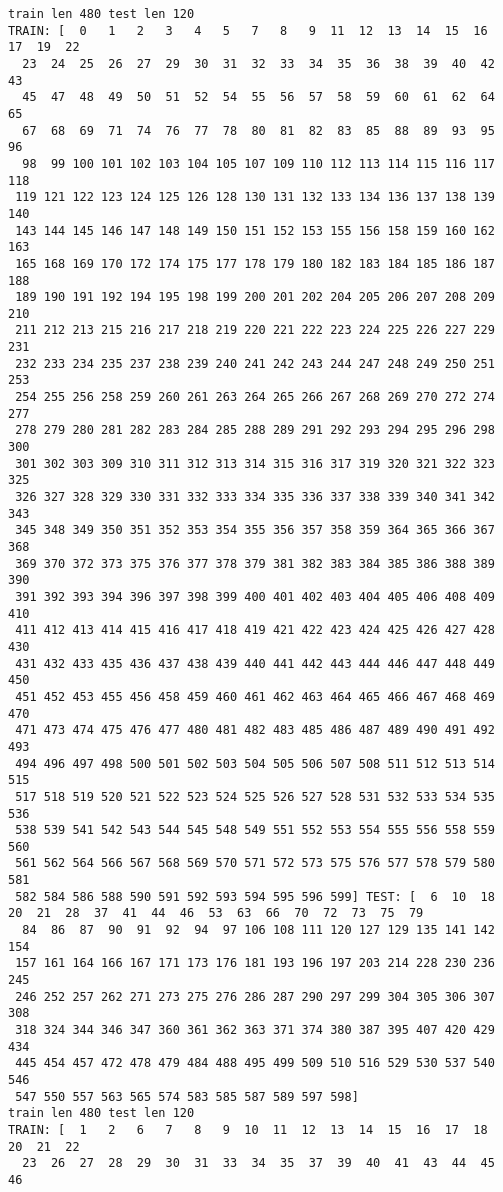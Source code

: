 \documentclass[11pt]{article}
\begin{document}
\begin{Verbatim}[commandchars=\\\{\}]
train len 480 test len 120
TRAIN: [  0   1   2   3   4   5   7   8   9  11  12  13  14  15  16  17  19  22
  23  24  25  26  27  29  30  31  32  33  34  35  36  38  39  40  42  43
  45  47  48  49  50  51  52  54  55  56  57  58  59  60  61  62  64  65
  67  68  69  71  74  76  77  78  80  81  82  83  85  88  89  93  95  96
  98  99 100 101 102 103 104 105 107 109 110 112 113 114 115 116 117 118
 119 121 122 123 124 125 126 128 130 131 132 133 134 136 137 138 139 140
 143 144 145 146 147 148 149 150 151 152 153 155 156 158 159 160 162 163
 165 168 169 170 172 174 175 177 178 179 180 182 183 184 185 186 187 188
 189 190 191 192 194 195 198 199 200 201 202 204 205 206 207 208 209 210
 211 212 213 215 216 217 218 219 220 221 222 223 224 225 226 227 229 231
 232 233 234 235 237 238 239 240 241 242 243 244 247 248 249 250 251 253
 254 255 256 258 259 260 261 263 264 265 266 267 268 269 270 272 274 277
 278 279 280 281 282 283 284 285 288 289 291 292 293 294 295 296 298 300
 301 302 303 309 310 311 312 313 314 315 316 317 319 320 321 322 323 325
 326 327 328 329 330 331 332 333 334 335 336 337 338 339 340 341 342 343
 345 348 349 350 351 352 353 354 355 356 357 358 359 364 365 366 367 368
 369 370 372 373 375 376 377 378 379 381 382 383 384 385 386 388 389 390
 391 392 393 394 396 397 398 399 400 401 402 403 404 405 406 408 409 410
 411 412 413 414 415 416 417 418 419 421 422 423 424 425 426 427 428 430
 431 432 433 435 436 437 438 439 440 441 442 443 444 446 447 448 449 450
 451 452 453 455 456 458 459 460 461 462 463 464 465 466 467 468 469 470
 471 473 474 475 476 477 480 481 482 483 485 486 487 489 490 491 492 493
 494 496 497 498 500 501 502 503 504 505 506 507 508 511 512 513 514 515
 517 518 519 520 521 522 523 524 525 526 527 528 531 532 533 534 535 536
 538 539 541 542 543 544 545 548 549 551 552 553 554 555 556 558 559 560
 561 562 564 566 567 568 569 570 571 572 573 575 576 577 578 579 580 581
 582 584 586 588 590 591 592 593 594 595 596 599] TEST: [  6  10  18  20  21  28  37  41  44  46  53  63  66  70  72  73  75  79
  84  86  87  90  91  92  94  97 106 108 111 120 127 129 135 141 142 154
 157 161 164 166 167 171 173 176 181 193 196 197 203 214 228 230 236 245
 246 252 257 262 271 273 275 276 286 287 290 297 299 304 305 306 307 308
 318 324 344 346 347 360 361 362 363 371 374 380 387 395 407 420 429 434
 445 454 457 472 478 479 484 488 495 499 509 510 516 529 530 537 540 546
 547 550 557 563 565 574 583 585 587 589 597 598]
train len 480 test len 120
TRAIN: [  1   2   6   7   8   9  10  11  12  13  14  15  16  17  18  20  21  22
  23  26  27  28  29  30  31  33  34  35  37  39  40  41  43  44  45  46

\end{Verbatim}
\end{document}
